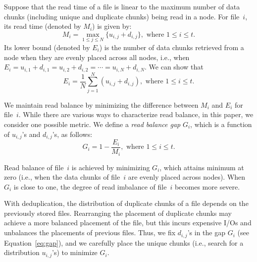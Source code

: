Suppose that the read time of a file is linear to the maximum number of data
chunks (including unique and duplicate chunks) being read in a node.  For
file~$i$, its read time (denoted by $M_i$) is given by:
%
\begin{equation}
M_i = \max_{1\le j\le N}\{ u_{i,j}+d_{i,j}\}, \textrm{ where $1\le i\le 
t$}.  
\end{equation}
%
Its lower bound (denoted by $E_i$) is the number of data chunks retrieved 
from a node when they are evenly placed across all nodes, i.e., when 
$E_i = u_{i,1} + d_{i,1} = u_{i,2} + d_{i,2} = \cdots = u_{i,N} + d_{i,N}$.
We can show that 
\begin{equation}
E_i = \frac{1}{N}\sum_{j=1}^{N} (u_{i,j}+d_{i,j}), \textrm{ where $1\le i\le
t$.}
\end{equation}

We maintain read balance by minimizing the difference between $M_i$ and $E_i$
for file~$i$.  While there are various ways to characterize read balance, in
this paper, we consider one possible metric.  We define a 
{\em read balance gap} $G_i$, which is a function of $u_{i,j}$'s and
$d_{i,j}$'s, as follows:
\begin{equation}
G_i = 1 - \frac{E_i}{M_i}, \textrm{ where $1\le i\le t$.}
\label{eq:gap}
\end{equation}

Read balance of file~$i$ is achieved by minimizing $G_i$, which attains
minimum at zero (i.e., when the data chunks of file~$i$ are evenly placed 
across nodes).  When $G_i$ is close to one, the degree of read imbalance of
file~$i$ becomes more severe.  


With deduplication, the distribution of duplicate chunks of a file depends on
the previously stored files.  Rearranging the placement of duplicate chunks
may achieve a more balanced placement of the file, but this incurs expensive
I/Os and unbalances the placements of previous files.  Thus, we fix
$d_{i,j}$'s in the gap $G_i$ (see Equation~\ref{eq:gap}), and we carefully
place the unique chunks (i.e., search for a distribution $u_{i,j}$'s) to
minimize $G_i$. 

